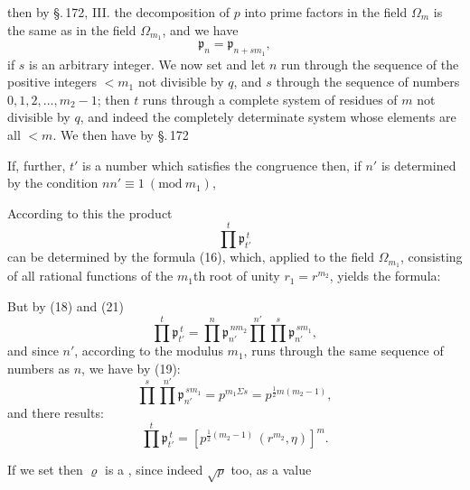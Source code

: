 then by \S.\,172, III. the decomposition of $p$ into prime factors in the field $\Omega_m$ is the same as in the field $\Omega_{m_1}$, and we have
\[
\mathfrak{p}_n = \mathfrak{p}_{n+sm_1},
\]
if $s$ is an arbitrary integer. We now set
and let $n$ run through the sequence of the positive integers $<m_1$ not divisible by $q$, and $s$ through the sequence of numbers $0,1,2,\ldots,m_2-1$; then $t$ runs through a complete system of residues of $m$ not divisible by $q$, and indeed the completely determinate system whose elements are all $<m$. We then have by \S.\,172

If, further, $t'$ is a number which satisfies the congruence
then, if $n'$ is determined by the condition $n n' \equiv 1\ (\mathrm{mod}\ m_1)$,

According to this the product
\[
\prod^{t} \mathfrak{p}_{t'}^{\,t}
\]
can be determined by the formula (16), which, applied to the field $\Omega_{m_1}$, consisting of all rational functions of the $m_1$th root of unity $r_1 = r^{m_2}$, yields the formula:

But by (18) and (21)
\[
\prod^{t} \mathfrak{p}_{t'}^{\,t} = \prod^{n} \mathfrak{p}_{n'}^{\,n m_2} \prod^{n'}\prod^{s} \mathfrak{p}_{n'}^{\,s m_1},
\]
and since $n'$, according to the modulus $m_1$, runs through the same sequence of numbers as $n$, we have by (19):
\[
\prod^{s}\prod^{n'} \mathfrak{p}_{n'}^{\,s m_1} = p^{m_1 \Sigma s} = p^{\frac{1}{2}m(m_2-1)},
\]
and there results:
\[
\prod^{t} \mathfrak{p}_{t'}^{\,t} = \left[p^{\frac{1}{2}(m_2-1)}\,(r^{m_2},\eta)\right]^m.
\]

If we set
then $\varrho$ is a , since indeed $\sqrt{p}$ too, as a value
